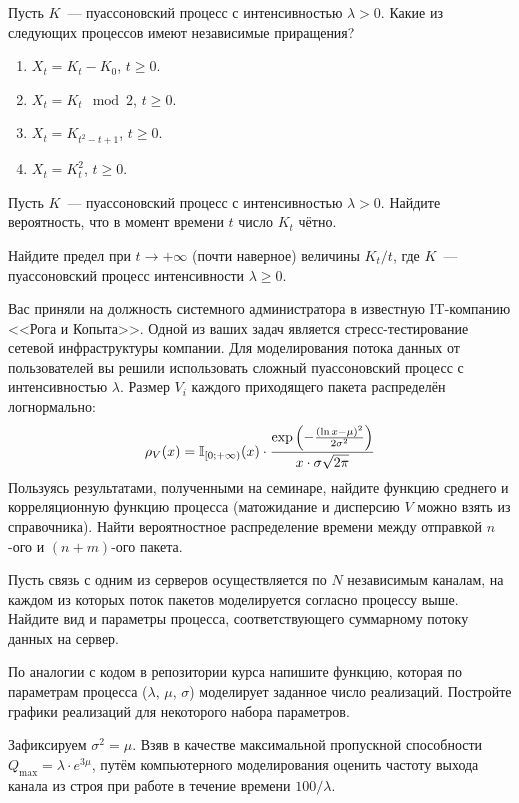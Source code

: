 \documentclass[12pt]{article}
\newcounter{HomeExercise}
\begin{document}
\begin{Exercise}[counter=HomeExercise]
    \noindent
    Пусть $ K $~--- пуассоновский процесс с интенсивностью $ \lambda > 0 $.
    Какие из следующих процессов имеют независимые приращения?
    \begin{enumerate}
        \item $ X_t = K_t - K_0 $, $ t \geqslant 0 $.
        \item $ X_t = K_t \mod 2 $, $ t \geqslant 0 $.
        \item $ X_t = K_{t^2 - t + 1} $, $ t \geqslant 0 $.
        \item $ X_t = K_t^2 $, $ t \geqslant 0 $.
    \end{enumerate}
\end{Exercise}


\begin{Exercise}[counter=HomeExercise]
    \noindent
    Пусть $ K $~--- пуассоновский процесс с интенсивностью $ \lambda > 0 $.
    Найдите вероятность, что в момент времени $ t $ число $ K_t $ чётно.
\end{Exercise}


\begin{Exercise}[counter=HomeExercise]
    \noindent
    Найдите предел при $ t \to +\infty $ (почти наверное) величины $ K_t / t $,
    где $ K $~--- пуассоновский процесс интенсивности $ \lambda \geqslant 0 $.
\end{Exercise}


\begin{Exercise}[counter=HomeExercise, title={(Практическое задание)}]
    \noindent
    Вас приняли на должность системного администратора в известную IT-компанию <<Рога и Копыта>>.
    Одной из ваших задач является стресс-тестирование сетевой инфраструктуры компании.
    Для моделирования потока данных от пользователей вы решили использовать сложный пуассоновский процесс с интенсивностью $ \lambda $.
    Размер $ V_i $ каждого приходящего пакета распределён логнормально:
    \[
        \rho_{V}(x) = \mathbb{I}_{[0;+\infty)}(x) \cdot \frac{\exp\left(-\frac{(\ln x - \mu)^2}{2 \sigma^2}\right)}{x \cdot \sigma \sqrt{2 \pi}}
    \]
    Пользуясь результатами, полученными на семинаре, найдите функцию среднего и корреляционную функцию процесса
    (матожидание и дисперсию $ V $ можно взять из справочника).
    Найти вероятностное распределение времени между отправкой $ n $-ого и $ (n+m) $-ого пакета.

    Пусть связь с одним из серверов осуществляется по $ N $ независимым каналам,
    на каждом из которых поток пакетов моделируется согласно процессу выше.
    Найдите вид и параметры процесса, соответствующего суммарному потоку данных на сервер.

    По аналогии с кодом в репозитории курса напишите функцию,
    которая по параметрам процесса ($ \lambda $, $ \mu $, $ \sigma $) моделирует заданное число реализаций.
    Постройте графики реализаций для некоторого набора параметров.

    Зафиксируем $ \sigma^2 = \mu $.
    Взяв в качестве максимальной пропускной способности $ Q_{\text{max}} = \lambda \cdot e^{3 \mu} $,
    путём компьютерного моделирования оценить частоту выхода канала из строя при работе в течение времени $ 100 / \lambda $.
\end{Exercise}
\end{document}
